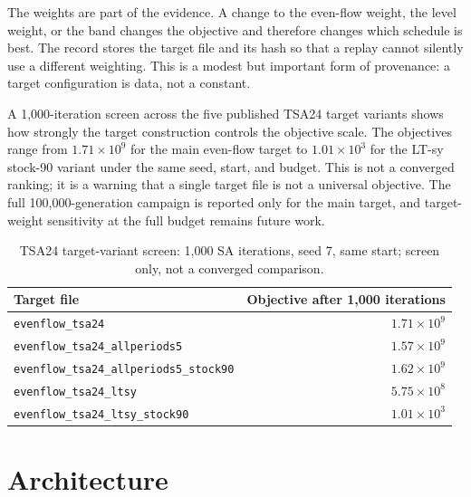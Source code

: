 \documentclass[preprint,11pt]{elsarticle}
\begin{document}
The weights are part of the evidence. A change to the even-flow weight, the level weight, or the band
changes the objective and therefore changes which schedule is best. The record stores the target file
and its hash so that a replay cannot silently use a different weighting. This is a modest but
important form of provenance: a target configuration is data, not a constant.

A 1,000-iteration screen across the five published TSA24 target variants shows how strongly the target
construction controls the objective scale. The objectives range from $1.71\times10^9$ for the main even-flow
target to $1.01\times10^3$ for the LT-sy stock-90 variant under the same seed, start, and budget. This is not a
converged ranking; it is a warning that a single target file is not a universal objective. The full
100,000-generation campaign is reported only for the main target, and target-weight sensitivity at the
full budget remains future work.

\begin{table}[t]
\centering
\caption{TSA24 target-variant screen: 1,000 SA iterations, seed 7, same start; screen only, not a
converged comparison.}
\label{tab:target-screen}
\small
\begin{tabular}{lr}
\toprule
Target file & Objective after 1,000 iterations \\
\midrule
\texttt{evenflow\_tsa24} & $1.71\times10^{9}$ \\
\texttt{evenflow\_tsa24\_allperiods5} & $1.57\times10^{9}$ \\
\texttt{evenflow\_tsa24\_allperiods5\_stock90} & $1.62\times10^{9}$ \\
\texttt{evenflow\_tsa24\_ltsy} & $5.75\times10^{8}$ \\
\texttt{evenflow\_tsa24\_ltsy\_stock90} & $1.01\times10^{3}$ \\
\bottomrule
\end{tabular}
\end{table}

\section{Architecture}\label{architecture}
\end{document}
